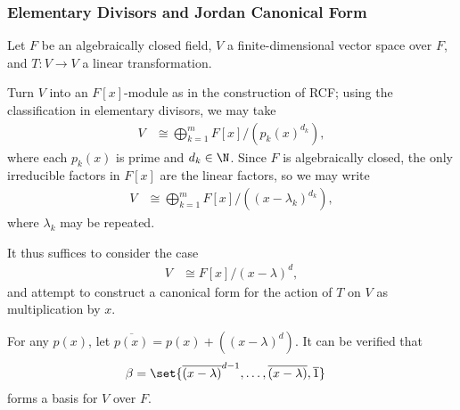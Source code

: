 \documentclass[10pt]{mypackage}
\begin{document}
\subsubsection{Elementary Divisors and Jordan Canonical Form}%
Let $F$ be an algebraically closed field, $V$ a finite-dimensional vector space over $F$, and $T\colon V\rightarrow V$ a linear transformation.

Turn $V$ into an $F[x]$-module as in the construction of RCF; using the classification in elementary divisors, we may take
\begin{align*}
  V &\cong \bigoplus_{k=1}^{m} F[x]/\left( p_k(x)^{d_k} \right),
\end{align*}
where each $p_k(x)$ is prime and $d_k\in \N$. Since $F$ is algebraically closed, the only irreducible factors in $F[x]$ are the linear factors, so we may write
\begin{align*}
  V &\cong \bigoplus_{k=1}^{m} F[x]/\left( \left( x-\lambda_k \right)^{d_k} \right),
\end{align*}
where $\lambda_k$ may be repeated.

It thus suffices to consider the case
\begin{align*}
  V &\cong F[x]/\left( x-\lambda \right)^{d},
\end{align*}
and attempt to construct a canonical form for the action of $T$ on $V$ as multiplication by $x$.

For any $p(x)$, let $ \overline{p(x)} = p(x) + \left( \left( x-\lambda \right)^{d} \right) $. It can be verified that
\begin{align*}
  \beta &= \set{ \overline{\left( x-\lambda \right)}^{d-1},\dots, \overline{\left( x-\lambda \right)}, \overline{1}}
\end{align*}
forms a basis for $V$ over $F$.
\end{document}
